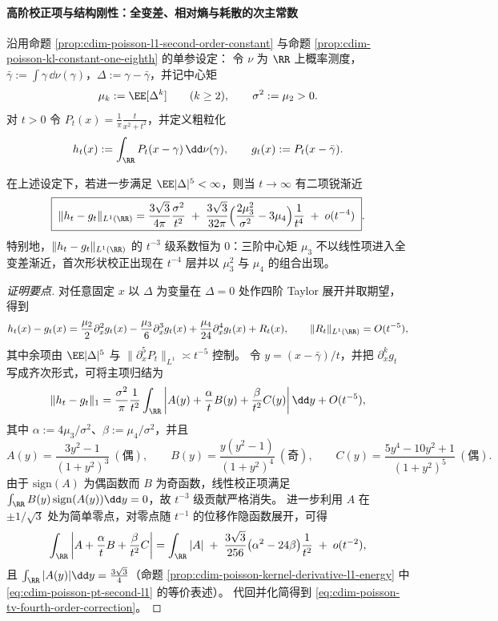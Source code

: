 \paragraph{高阶校正项与结构刚性：全变差、相对熵与耗散的次主常数}
沿用命题 \ref{prop:cdim-poisson-l1-second-order-constant} 与命题 \ref{prop:cdim-poisson-kl-constant-one-eighth} 的单参设定：
令 \(\nu\) 为 \(\RR\) 上概率测度，\(\bar\gamma:=\int \gamma\,\dd\nu(\gamma)\)，\(\Delta:=\gamma-\bar\gamma\)，并记中心矩
\[
\mu_k:=\EE[\Delta^k]\qquad(k\ge 2),
\qquad
\sigma^2:=\mu_2>0.
\]
对 \(t>0\) 令 \(P_t(x)=\frac{1}{\pi}\frac{t}{x^2+t^2}\)，并定义粗粒化
\[
h_t(x):=\int_{\RR}P_t(x-\gamma)\,\dd\nu(\gamma),
\qquad
g_t(x):=P_t(x-\bar\gamma).
\]

\begin{proposition}\label{prop:cdim-poisson-tv-fourth-order-correction}
在上述设定下，若进一步满足 \(\EE|\Delta|^5<\infty\)，则当 \(t\to\infty\) 有二项锐渐近
\begin{equation}\label{eq:cdim-poisson-tv-fourth-order-correction}
\boxed{\;
\|h_t-g_t\|_{L^{1}(\RR)}
=\frac{3\sqrt3}{4\pi}\frac{\sigma^2}{t^2}
\;+\;
\frac{3\sqrt3}{32\pi}\Bigl(\frac{2\mu_3^2}{\sigma^2}-3\mu_4\Bigr)\frac{1}{t^4}
\;+\;o(t^{-4})\; }.
\end{equation}
特别地，\(\|h_t-g_t\|_{L^{1}(\RR)}\) 的 \(t^{-3}\) 级系数恒为 \(0\)：三阶中心矩 \(\mu_3\) 不以线性项进入全变差渐近，首次形状校正出现在 \(t^{-4}\) 层并以 \(\mu_3^2\) 与 \(\mu_4\) 的组合出现。
\end{proposition}
\begin{proof}[证明要点]
对任意固定 \(x\) 以 \(\Delta\) 为变量在 \(\Delta=0\) 处作四阶 Taylor 展开并取期望，得到
\[
h_t(x)-g_t(x)
=\frac{\mu_2}{2}\partial_x^2 g_t(x)-\frac{\mu_3}{6}\partial_x^3 g_t(x)+\frac{\mu_4}{24}\partial_x^4 g_t(x)+R_t(x),
\qquad
\|R_t\|_{L^1(\RR)}=O(t^{-5}),
\]
其中余项由 \(\EE|\Delta|^5\) 与 \(\|\partial_x^5P_t\|_{L^1}\asymp t^{-5}\) 控制。
令 \(y=(x-\bar\gamma)/t\)，并把 \(\partial_x^k g_t\) 写成齐次形式，可将主项归结为
\[
\|h_t-g_t\|_{1}
=\frac{\sigma^2}{\pi}\frac{1}{t^2}\int_{\RR}\left|A(y)+\frac{\alpha}{t}B(y)+\frac{\beta}{t^2}C(y)\right|\dd y+O(t^{-5}),
\]
其中 \(\alpha:=4\mu_3/\sigma^2\)、\(\beta:=\mu_4/\sigma^2\)，并且
\[
A(y)=\frac{3y^2-1}{(1+y^2)^3}\ (\text{偶}),
\qquad
B(y)=\frac{y(y^2-1)}{(1+y^2)^4}\ (\text{奇}),
\qquad
C(y)=\frac{5y^4-10y^2+1}{(1+y^2)^5}\ (\text{偶}).
\]
由于 \(\mathrm{sign}(A)\) 为偶函数而 \(B\) 为奇函数，线性校正项满足
\(
\int_{\RR}B(y)\,\mathrm{sign}(A(y))\dd y=0
\)，故 \(t^{-3}\) 级贡献严格消失。
进一步利用 \(A\) 在 \(\pm 1/\sqrt3\) 处为简单零点，对零点随 \(t^{-1}\) 的位移作隐函数展开，可得
\[
\int_{\RR}\left|A+\frac{\alpha}{t}B+\frac{\beta}{t^2}C\right|
=\int_{\RR}|A|
\;+\;\frac{3\sqrt3}{256}\bigl(\alpha^2-24\beta\bigr)\frac{1}{t^2}
\;+\;o(t^{-2}),
\]
且 \(\int_{\RR}|A(y)|\dd y=\frac{3\sqrt3}{4}\)（命题 \ref{prop:cdim-poisson-kernel-derivative-l1-energy} 中 \eqref{eq:cdim-poisson-pt-second-l1} 的等价表述）。
代回并化简得到 \eqref{eq:cdim-poisson-tv-fourth-order-correction}。
\end{proof}

